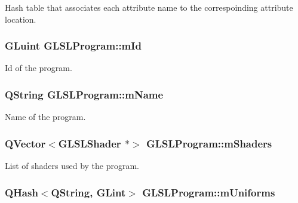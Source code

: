 Hash table that associates each attribute name to the correspoinding attribute location. 

\hypertarget{class_g_l_s_l_program_aa42c740f7c6436e49400334f06dd089a}{
\subsubsection[{m\+Id}]{\setlength{\rightskip}{0pt plus 5cm}G\+Luint G\+L\+S\+L\+Program\+::m\+Id\hspace{0.3cm}{\ttfamily [private]}}}\label{class_g_l_s_l_program_aa42c740f7c6436e49400334f06dd089a}


Id of the program. 

\hypertarget{class_g_l_s_l_program_a1d86ce477a8e3730e806596a03f0f482}{
\subsubsection[{m\+Name}]{\setlength{\rightskip}{0pt plus 5cm}Q\+String G\+L\+S\+L\+Program\+::m\+Name\hspace{0.3cm}{\ttfamily [private]}}}\label{class_g_l_s_l_program_a1d86ce477a8e3730e806596a03f0f482}


Name of the program. 

\hypertarget{class_g_l_s_l_program_a62fef2720556c14a2b27cbe6414875c1}{
\subsubsection[{m\+Shaders}]{\setlength{\rightskip}{0pt plus 5cm}Q\+Vector$<${\bf G\+L\+S\+L\+Shader} $\ast$$>$ G\+L\+S\+L\+Program\+::m\+Shaders\hspace{0.3cm}{\ttfamily [private]}}}\label{class_g_l_s_l_program_a62fef2720556c14a2b27cbe6414875c1}


List of shaders used by the program. 

\hypertarget{class_g_l_s_l_program_a3579d46dba1062e274dd91147ea05392}{
\subsubsection[{m\+Uniforms}]{\setlength{\rightskip}{0pt plus 5cm}Q\+Hash$<$Q\+String, G\+Lint$>$ G\+L\+S\+L\+Program\+::m\+Uniforms\hspace{0.3cm}{\ttfamily [private]}}}\label{class_g_l_s_l_program_a3579d46dba1062e274dd91147ea05392}


